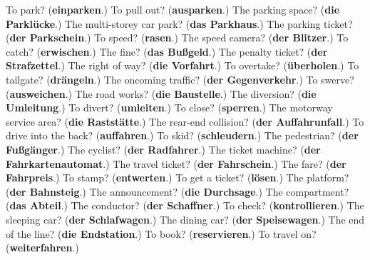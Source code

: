 \begin{tcolorbox}[breakable,colback=teal!4,colframe=teal!35!black,title={Before you move on}]
To park? (\textbf{einparken}.) To pull out? (\textbf{ausparken}.) The parking space? (\textbf{die Parklücke}.) The multi-storey car park? (\textbf{das Parkhaus}.) The parking ticket? (\textbf{der Parkschein}.) To speed? (\textbf{rasen}.) The speed camera? (\textbf{der Blitzer}.) To catch? (\textbf{erwischen}.) The fine? (\textbf{das Bußgeld}.) The penalty ticket? (\textbf{der Strafzettel}.) The right of way? (\textbf{die Vorfahrt}.) To overtake? (\textbf{überholen}.) To tailgate? (\textbf{drängeln}.) The oncoming traffic? (\textbf{der Gegenverkehr}.) To swerve? (\textbf{ausweichen}.) The road works? (\textbf{die Baustelle}.) The diversion? (\textbf{die Umleitung}.) To divert? (\textbf{umleiten}.) To close? (\textbf{sperren}.) The motorway service area? (\textbf{die Raststätte}.) The rear-end collision? (\textbf{der Auffahrunfall}.) To drive into the back? (\textbf{auffahren}.) To skid? (\textbf{schleudern}.) The pedestrian? (\textbf{der Fußgänger}.) The cyclist? (\textbf{der Radfahrer}.) The ticket machine? (\textbf{der Fahrkartenautomat}.) The travel ticket? (\textbf{der Fahrschein}.) The fare? (\textbf{der Fahrpreis}.) To stamp? (\textbf{entwerten}.) To get a ticket? (\textbf{lösen}.) The platform? (\textbf{der Bahnsteig}.) The announcement? (\textbf{die Durchsage}.) The compartment? (\textbf{das Abteil}.) The conductor? (\textbf{der Schaffner}.) To check? (\textbf{kontrollieren}.) The sleeping car? (\textbf{der Schlafwagen}.) The dining car? (\textbf{der Speisewagen}.) The end of the line? (\textbf{die Endstation}.) To book? (\textbf{reservieren}.) To travel on? (\textbf{weiterfahren}.)
\end{tcolorbox}
